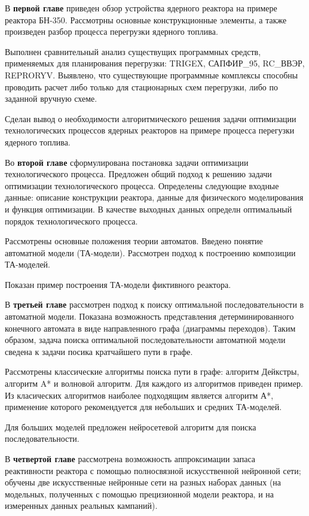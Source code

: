 В \textbf{первой главе} приведен обзор устройства ядерного реактора на примере реактора БН-350.
Рассмотрны основные конструкционные элементы, а также произведен разбор процесса перегрузки ядерного топлива.

Выполнен сравнительный анализ существущих программных средств, применяемых для планирования перегрузки: TRIGEX, САПФИР\_95, RC\_ВВЭР, REPRORYV.
Выявлено, что существующие программные комплексы способны проводить расчет либо только для стационарных схем перегрузки, либо по заданной вручную схеме.

Сделан вывод о необходимости алгоритмического решения задачи оптимизации технологических процессов ядерных реакторов на примере процесса перегузки ядерного топлива.

Во \textbf{второй главе} сформулирована постановка задачи оптимизации технологического процесса.
Предложен общий подход к решению задачи оптимизации технологического процесса.
Определены следующие входные данные: описание конструкции реактора, данные для физического моделирования и функция оптимизации.
В качестве выходных данных определн оптимальный порядок технологического процесса.

Рассмотрены основные положения теории автоматов.
Введено понятие автоматной модели (ТА-модели).
Рассмотрен подход к построению композиции ТА-моделей.

Показан пример построения ТА-модели фиктивного реактора.

В \textbf{третьей главе} рассмотрен подход к поиску оптимальной последовательности в автоматной модели.
Показана возможность представления детерминированного конечного автомата в виде направленного графа (диаграммы переходов).
Таким образом, задача поиска оптимальной последовательности автоматной модели сведена к задачи посика кратчайшего пути в графе.

Рассмотрены классические алгоритмы поиска пути в графе: алгоритм Дейкстры, алгоритм A* и волновой алгоритм.
Для каждого из алгоритмов приведен пример.
Из класических алгоритмов наиболее подходящим является алгоритм А*, применение которого рекомендуется для небольших и средних ТА-моделей.

Для больших моделей предложен нейросетевой алгоритм для поиска последовательности.

В \textbf{четвертой главе} рассмотрена возможность аппроксимации запаса реактивности реактора с помощью полносвязной искусственной нейронной сети; обучены две искусственные нейронные сети на разных наборах данных (на модельных, полученных с помощью прецизионной модели реактора, и на измеренных данных реальных кампаний). 

